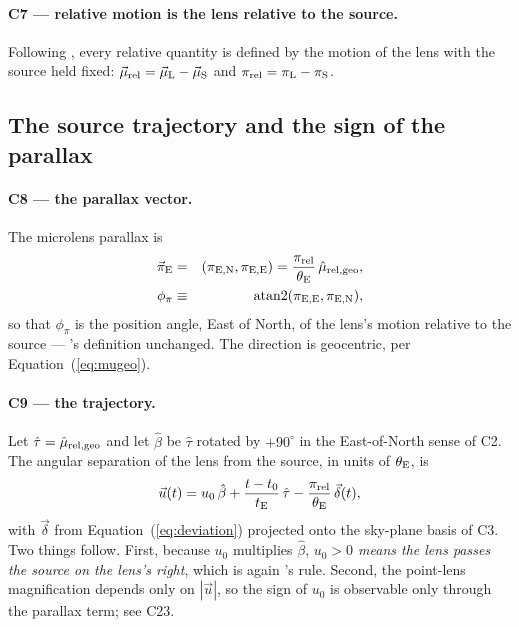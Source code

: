 \paragraph{C7 --- relative motion is the lens relative to the source.}
Following \citet[Appendix~A.6]{Skowron:2011}, every relative quantity is
defined by the motion of the lens with the source held fixed:
$\vec{\mu}_{\rm rel} = \vec{\mu}_{\rm L} -
\vec{\mu}_{\rm S}$ and $\pi_{\rm rel} = \pi_{\rm L} - \pi_{\rm S}$.

\subsection{The source trajectory and the sign of the parallax}
\label{sec:conv:trajectory}

\paragraph{C8 --- the parallax vector.}  The microlens parallax is
\begin{eqnarray}
  \vec{\pi}_{\rm E} &=& (\pi_{\rm E,N}, \pi_{\rm E,E})
    = \frac{\pi_{\rm rel}}{\theta_{\rm E}}\,
      \hat{\mu}_{\rm rel,geo},
      \label{eq:pie} \\
  \phi_\pi &\equiv& \mathrm{atan2}(\pi_{\rm E,E}, \pi_{\rm E,N}),
  \label{eq:phipi}
\end{eqnarray}
so that $\phi_\pi$ is the position angle, East of North, of the lens's
motion relative to the source --- \citeauthor{Skowron:2011}'s definition
unchanged.  The direction is geocentric, per Equation~(\ref{eq:mugeo}).

\paragraph{C9 --- the trajectory.}  Let $\hat{\tau} =
\hat{\mu}_{\rm rel,geo}$ and let $\hat{\beta}$ be $\hat{\tau}$
rotated by $+90^\circ$ in the East-of-North sense of C2.  The angular
separation of the lens from the source, in units of $\theta_{\rm E}$, is
\begin{equation}
  \vec{u}(t) = u_0\,\hat{\beta}
    + \frac{t - t_0}{t_{\rm E}}\,\hat{\tau}
    - \frac{\pi_{\rm rel}}{\theta_{\rm E}}\,\vec{\delta}(t),
  \label{eq:traj}
\end{equation}
with $\vec{\delta}$ from Equation~(\ref{eq:deviation}) projected onto
the sky-plane basis of C3.  Two things follow.  First, because $u_0$
multiplies $\hat{\beta}$, \emph{$u_0 > 0$ means the lens passes the source
on the lens's right}, which is again \citeauthor{Skowron:2011}'s rule.
Second, the point-lens magnification \citep{Paczynski:1986} depends only on
$|\vec{u}|$, so the sign of $u_0$ is observable only through the
parallax term; see C23.

